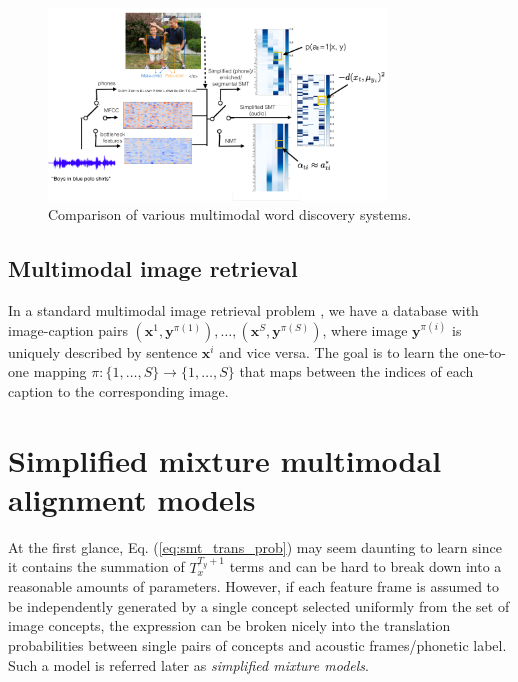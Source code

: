 \documentclass[journal]{IEEEtran}
\begin{document}
\begin{figure}[t]
    \centering
    \includegraphics[width=0.8\textwidth]{fig_1.png}
    \caption{Comparison of various multimodal word discovery systems.}
    \label{fig:model_comparison}
\end{figure}

\subsection{Multimodal image retrieval}
In a standard multimodal image retrieval problem \cite{Karpathy14}, we have a database with image-caption pairs $(\mathbf x^1, \mathbf y^{\pi(1)}), \ldots, (\mathbf x^S, \mathbf y^{\pi(S)})$, where image $\mathbf y^{\pi(i)}$ is uniquely described by sentence $\mathbf x^i$ and vice versa. The goal is to learn the one-to-one mapping $\pi: \{1, \ldots, S\} \rightarrow \{1, \ldots, S\}$ that maps between the indices of each caption to the corresponding image. 

\section{Simplified mixture multimodal alignment models}
At the first glance, Eq. (\ref{eq:smt_trans_prob}) may seem daunting to learn since it contains the summation of $T_x^{T_y+1}$ terms and can be hard to break down into a reasonable amounts of parameters. However, if each feature frame is assumed to be independently generated by a single concept selected uniformly from the set of image concepts, the expression can be broken nicely into the translation probabilities between single pairs of concepts and acoustic frames/phonetic label. Such a model is referred later as \textit{simplified mixture models}.
\end{document}
